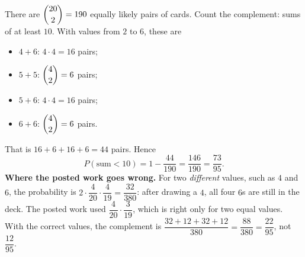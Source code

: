 There are $\dbinom{20}{2}=190$ equally likely pairs of cards. Count the complement: sums of at least $10$. With values from $2$ to $6$, these are
\begin{itemize}
\item $4+6$: $4\cdot4=16$ pairs;
\item $5+5$: $\dbinom42=6$ pairs;
\item $5+6$: $4\cdot4=16$ pairs;
\item $6+6$: $\dbinom42=6$ pairs.
\end{itemize}
That is $16+6+16+6=44$ pairs. Hence
\[
P(\text{sum}<10)=1-\dfrac{44}{190}=\dfrac{146}{190}=\boxed{\dfrac{73}{95}}.
\]
\textbf{Where the posted work goes wrong.} For two \emph{different} values, such as $4$ and $6$, the probability is $2\cdot\dfrac{4}{20}\cdot\dfrac{4}{19}=\dfrac{32}{380}$: after drawing a $4$, all four $6$s are still in the deck. The posted work used $\dfrac{4}{20}\cdot\dfrac{3}{19}$, which is right only for two equal values. With the correct values, the complement is $\dfrac{32+12+32+12}{380}=\dfrac{88}{380}=\dfrac{22}{95}$, not $\dfrac{12}{95}$.
